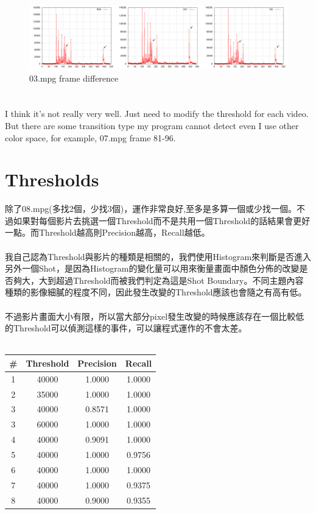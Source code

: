 \documentclass[11pt]{article}
\begin{document}
\begin{figure}[ht]
\centering
\includegraphics[scale=0.2]{03_color_space.png}
\caption{03.mpg frame difference}
\label{}
\end{figure}

\section{}
I think it's not really very well. Just need to modify the threshold for each video. But there are some transition type my program cannot detect even I use other color space, for example, 07.mpg frame 81-96.

\section{Thresholds}
\begin{CJK}{UTF8}{bkai}
除了08.mpg(多找2個，少找3個)，運作非常良好,至多是多算一個或少找一個。不過如果對每個影片去挑選一個Threshold而不是共用一個Threshold的話結果會更好一點。而Threshold越高則Precision越高，Recall越低。\\
\\
我自己認為Threshold與影片的種類是相關的，我們使用Histogram來判斷是否進入另外一個Shot，是因為Histogram的變化量可以用來衡量畫面中顏色分佈的改變是否夠大，大到超過Threshold而被我們判定為這是Shot Boundary。不同主題內容種類的影像細膩的程度不同，因此發生改變的Threshold應該也會隨之有高有低。\\
\\
不過影片畫面大小有限，所以當大部分pixel發生改變的時候應該存在一個比較低的Threshold可以偵測這樣的事件，可以讓程式運作的不會太差。\\
\\
\begin{tabular}{c|c||c|c}
	\# & Threshold & Precision & Recall \\
\hline
\hline
	1 & 40000 & 1.0000 & 1.0000\\
\hline
	2 & 35000 & 1.0000 & 1.0000\\
\hline
	3 & 40000 & 0.8571 & 1.0000\\
	3 & 60000 & 1.0000 & 1.0000\\
\hline
	4 & 40000 & 0.9091 & 1.0000\\
\hline
	5 & 40000 & 1.0000 & 0.9756\\
\hline
	6 & 40000 & 1.0000 & 1.0000\\
\hline
	7 & 40000 & 1.0000 & 0.9375\\
\hline
	8 & 40000 & 0.9000 & 0.9355\\
\end{tabular}

\end{CJK}
\end{document}
